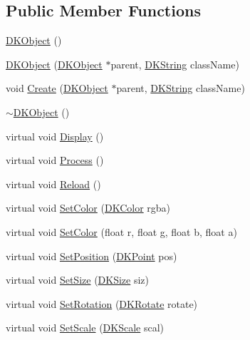 \subsection*{Public Member Functions}
\begin{DoxyCompactItemize}
\item 
\hyperlink{class_d_k_object_ad91c0e6a83aa4ef1a5ad063f8db3adac}{D\-K\-Object} ()
\item 
\hyperlink{class_d_k_object_aef9ce0acf9e5439faebcc2322d0e2b8d}{D\-K\-Object} (\hyperlink{class_d_k_object}{D\-K\-Object} $\ast$parent, \hyperlink{_d_k_string_8h_ac168e8555ceba18e1a2919b21976bc84}{D\-K\-String} class\-Name)
\item 
void \hyperlink{class_d_k_object_ab8406cdd1fbd1f6d0502a893beaae3dd}{Create} (\hyperlink{class_d_k_object}{D\-K\-Object} $\ast$parent, \hyperlink{_d_k_string_8h_ac168e8555ceba18e1a2919b21976bc84}{D\-K\-String} class\-Name)
\item 
\hyperlink{class_d_k_object_afac42f9df5de88af4b2a212c98999e09}{$\sim$\-D\-K\-Object} ()
\item 
virtual void \hyperlink{class_d_k_object_a6c7afb48b29a473ecf68f2af29f17ca9}{Display} ()
\item 
virtual void \hyperlink{class_d_k_object_aa257e4692f9651249969a21c23e3483c}{Process} ()
\item 
virtual void \hyperlink{class_d_k_object_a02180120e4f6bdcb3d3e736ec48a52f5}{Reload} ()
\item 
virtual void \hyperlink{class_d_k_object_ad7efc4ece83aad0ab6798e77b73cc33e}{Set\-Color} (\hyperlink{class_d_k_color}{D\-K\-Color} rgba)
\item 
virtual void \hyperlink{class_d_k_object_a8bfdf492464355a5a468aecfe91561d9}{Set\-Color} (float r, float g, float b, float a)
\item 
virtual void \hyperlink{class_d_k_object_afe058d7da128d03e09339f6e5a342456}{Set\-Position} (\hyperlink{_d_k_axis_8h_a0ca1f005fbb936f8e7a7f2433591f418}{D\-K\-Point} pos)
\item 
virtual void \hyperlink{class_d_k_object_a3b7ce9102fdf1d8e3404d73e79be8901}{Set\-Size} (\hyperlink{_d_k_axis_8h_aaa25a8c7cbf504fffdb8a4208ff7a731}{D\-K\-Size} siz)
\item 
virtual void \hyperlink{class_d_k_object_a9014300c0e9effb0e09d90e1a79b0d4c}{Set\-Rotation} (\hyperlink{_d_k_axis_8h_a886498401ce03ee3a95cb58785ab475a}{D\-K\-Rotate} rotate)
\item 
virtual void \hyperlink{class_d_k_object_adde67a034e037b99f2f2546d04362545}{Set\-Scale} (\hyperlink{_d_k_axis_8h_ab9e555d97d32f68d4c77474d1e1ba787}{D\-K\-Scale} scal)

\end{DoxyCompactItemize}
